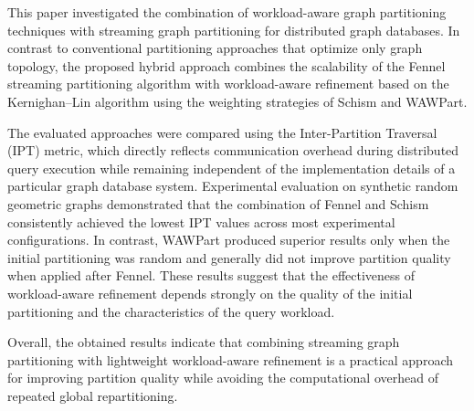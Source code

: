This paper investigated the combination of workload-aware graph partitioning techniques with streaming graph partitioning for distributed graph databases. In contrast to conventional partitioning approaches that optimize only graph topology, the proposed hybrid approach combines the scalability of the Fennel streaming partitioning algorithm with workload-aware refinement based on the Kernighan--Lin algorithm using the weighting strategies of Schism and WAWPart.

The evaluated approaches were compared using the Inter-Partition Traversal (IPT) metric, which directly reflects communication overhead during distributed query execution while remaining independent of the implementation details of a particular graph database system. Experimental evaluation on synthetic random geometric graphs demonstrated that the combination of Fennel and Schism consistently achieved the lowest IPT values across most experimental configurations. In contrast, WAWPart produced superior results only when the initial partitioning was random and generally did not improve partition quality when applied after Fennel. These results suggest that the effectiveness of workload-aware refinement depends strongly on the quality of the initial partitioning and the characteristics of the query workload.

Overall, the obtained results indicate that combining streaming graph partitioning with lightweight workload-aware refinement is a practical approach for improving partition quality while avoiding the computational overhead of repeated global repartitioning.
